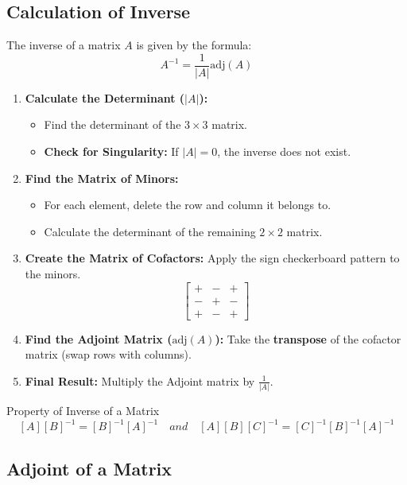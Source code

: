 \subsection{Calculation of Inverse}

The inverse of a matrix $A$ is given by the formula:
$$ A^{-1} = \frac{1}{|A|} \text{adj}(A) $$

\begin{enumerate}
    \item \textbf{Calculate the Determinant ($|A|$):}
    \begin{itemize}
        \item Find the determinant of the $3 \times 3$ matrix.
        \item \textbf{Check for Singularity:} If $|A| = 0$, the inverse does not exist.
    \end{itemize}

    \item \textbf{Find the Matrix of Minors:}
    \begin{itemize}
        \item For each element, delete the row and column it belongs to.
        \item Calculate the determinant of the remaining $2 \times 2$ matrix.
    \end{itemize}

    \item \textbf{Create the Matrix of Cofactors:} Apply the sign checkerboard pattern to the minors. $$ \begin{bmatrix} + & - & + \\ - & + & - \\ + & - & + \end{bmatrix} $$

    \item \textbf{Find the Adjoint Matrix ($\text{adj}(A)$):} Take the \textbf{transpose} of the cofactor matrix (swap rows with columns).

    \item \textbf{Final Result:} Multiply the Adjoint matrix by $\frac{1}{|A|}$.
\end{enumerate}

\begin{impbox}{Property of Inverse of a Matrix}
    $${[A][B]}^{-1} = [B]^{-1} [A]^{-1} \quad and \quad {[A][B][C]}^{-1} = [C]^{-1} [B]^{-1} [A]^{-1}$$
\end{impbox}

\subsection{Adjoint of a Matrix}

